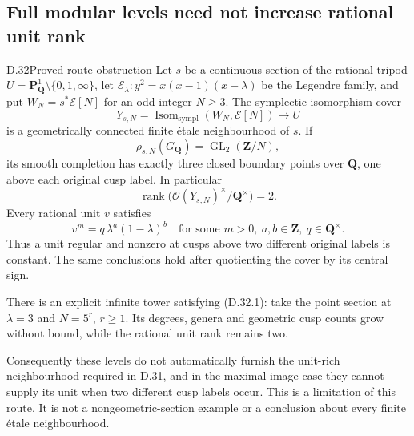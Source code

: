 \subsection{Full modular levels need not increase rational unit rank}

\begin{claim}{D.32}{Proved route obstruction}\label{clm:D32}
Let $s$ be a continuous section of the rational tripod
$U=\mathbf P^1_{\mathbf Q}\setminus\{0,1,\infty\}$, let
$\mathcal E_\lambda:y^2=x(x-1)(x-\lambda)$ be the Legendre family,
and put $W_N=s^*\mathcal E[N]$ for an odd integer $N\ge3$.
The symplectic-isomorphism cover
\[
 Y_{s,N}=\operatorname{Isom}_{\mathrm{sympl}}
               (W_N,\mathcal E[N])\longrightarrow U
\]
is a geometrically connected finite \'{e}tale neighbourhood of $s$.
If
\[
 \rho_{s,N}(G_{\mathbf Q})=
                 \operatorname{GL}_2(\mathbf Z/N),
 \tag{D.32.1}
\]
its smooth completion has exactly three closed boundary points over
$\mathbf Q$, one above each original cusp label. In particular
\[
 \operatorname{rank}
       \bigl(\mathcal O(Y_{s,N})^\times/\mathbf Q^\times\bigr)=2.
 \tag{D.32.2}
\]
Every rational unit $v$ satisfies
\[
          v^m=q\,\lambda^a(1-\lambda)^b
 \quad\text{for some }m>0,\ a,b\in\mathbf Z,\
 q\in\mathbf Q^\times.
 \tag{D.32.3}
\]
Thus a unit regular and nonzero at cusps above two different
original labels is constant. The same conclusions hold after
quotienting the cover by its central sign.

There is an explicit infinite tower satisfying
\textup{(D.32.1)}: take the point section at $\lambda=3$ and
$N=5^r$, $r\ge1$. Its degrees, genera and geometric cusp counts
grow without bound, while the rational unit rank remains two.

Consequently these levels do not automatically furnish the
unit-rich neighbourhood required in D.31, and in the
maximal-image case they cannot supply its unit when two different
cusp labels occur. This is a limitation of this route. It is not
a nongeometric-section example or a conclusion about every finite
\'{e}tale neighbourhood.
\end{claim}

